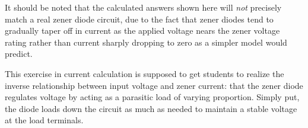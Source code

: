 It should be noted that the calculated answers shown here will {\it not} precisely match a real zener diode circuit, due to the fact that zener diodes tend to gradually taper off in current as the applied voltage nears the zener voltage rating rather than current sharply dropping to zero as a simpler model would predict.







This exercise in current calculation is supposed to get students to realize the inverse relationship between input voltage and zener current: that the zener diode regulates voltage by acting as a parasitic load of varying proportion.  Simply put, the diode loads down the circuit as much as needed to maintain a stable voltage at the load terminals.




